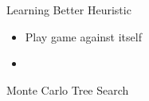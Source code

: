 \documentclass{beamer}
\begin{document}
\begin{frame}{Learning Better Heuristic}
  \begin{itemize}
  \item Play game against itself
  \item 
  \end{itemize}
\end{frame}

\begin{frame}{Monte Carlo Tree Search}
  
\end{frame}

\begin{frame}
  
\end{frame}

\begin{frame}
  
\end{frame}
\end{document}
